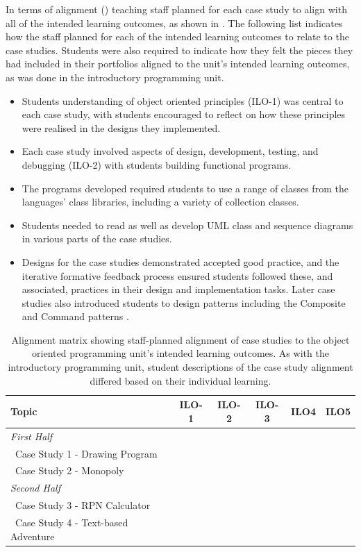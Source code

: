 In terms of alignment () teaching staff planned for each case study to align with all of the intended learning outcomes, as shown in . The following list indicates how the staff planned for each of the intended learning outcomes to relate to the case studies. Students were also required to indicate how they felt the pieces they had included in their portfolios aligned to the unit's intended learning outcomes, as was done in the introductory programming unit. 
\begin{itemize}[noitemsep,nolistsep]
	\item Students understanding of object oriented principles (ILO-1) was central to each case study, with students encouraged to reflect on how these principles were realised in the designs they implemented. 
	\item Each case study involved aspects of design, development, testing, and debugging (ILO-2) with students building functional programs. 
	\item The programs developed required students to use a range of classes from the languages' class libraries, including a variety of collection classes.
	\item Students needed to read as well as develop UML class and sequence diagrams in various parts of the case studies.
	\item Designs for the case studies demonstrated accepted good practice, and the iterative formative feedback process ensured students followed these, and associated, practices in their design and implementation tasks. Later case studies also introduced students to design patterns including the Composite and Command patterns \cite{Gamma:2001}.
\end{itemize}

\begin{table}[b]
	\centering
	\caption{Alignment matrix showing staff-planned alignment of case studies to the object oriented programming unit's intended learning outcomes. As with the introductory programming unit, student descriptions of the case study alignment differed based on their individual learning.}
	\label{tbl:oop_matrix}
	\begin{tabular}{l|ccccc}
		\textbf{Topic} 								& \textbf{ILO-1} & \textbf{ILO-2} & \textbf{ILO-3} & \textbf{ILO4} & \textbf{ILO5} \\ \hline
		\emph{First Half} & & & & & \\
		~Case Study 1 - Drawing Program & \checkmark & \checkmark & \checkmark & \checkmark & \checkmark \\
		~Case Study 2 - Monopoly & \checkmark & \checkmark & \checkmark & \checkmark & \checkmark \\
		\hline
		\emph{Second Half} & & & & & \\
		~Case Study 3 - RPN Calculator & \checkmark & \checkmark & \checkmark & \checkmark & \checkmark \\
		~Case Study 4 - Text-based Adventure & \checkmark & \checkmark & \checkmark & \checkmark & \checkmark \\
	\end{tabular}
\end{table}

